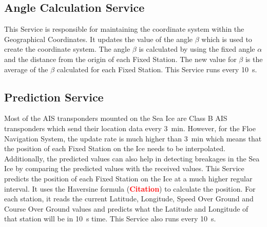 \subsection{Angle Calculation Service}
\label{sec:sec5_2_5}
\noindent
%
This Service is responsible for maintaining the coordinate system within the Geographical Coordinates. It updates the value of the angle $\beta$ which is used to create the coordinate system. The angle $\beta$ is calculated by using the fixed angle $\alpha$ and the distance from the origin of each Fixed Station. The new value for $\beta$ is the average of the $\beta$ calculated for each Fixed Station. This Service runs every \SI{10}{\second}.
%
\subsection{Prediction Service}
\label{sec:sec5_2_6}
\noindent
%
Most of the AIS transponders mounted on the Sea Ice are Class B AIS transponders which send their location data every \SI{3}{\minute}. However, for the Floe Navigation System, the update rate is much higher than \SI{3}{\minute} which means that the position of each Fixed Station on the Ice needs to be interpolated. Additionally, the predicted values can also help in detecting breakages in the Sea Ice by comparing the predicted values with the received values.
\newline
\noindent 
This Service predicts the position of each Fixed Station on the Ice at a much higher regular interval. It uses the Haversine formula (\textbf{\textcolor{red}{Citation}}) to calculate the position. For each station, it reads the current Latitude, Longitude, Speed Over Ground and Course Over Ground values and predicts what the Latitude and Longitude of that station will be in \SI{10}{\second} time. This Service also runs every \SI{10}{\second}.
%
